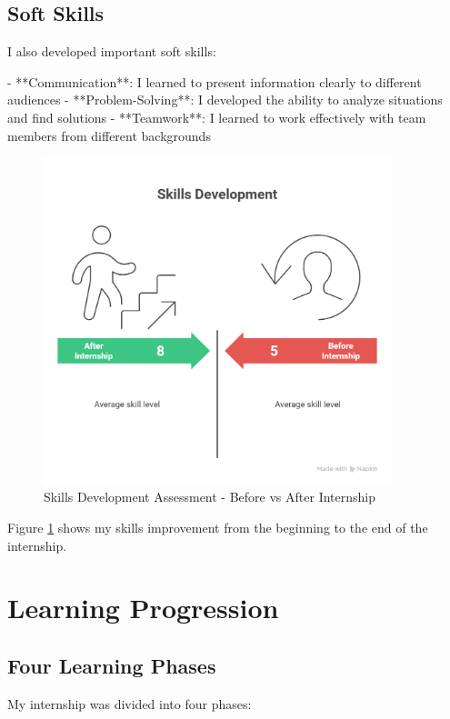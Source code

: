 \subsection{Soft Skills}
I also developed important soft skills:

- **Communication**: I learned to present information clearly to different audiences
- **Problem-Solving**: I developed the ability to analyze situations and find solutions
- **Teamwork**: I learned to work effectively with team members from different backgrounds

\begin{figure}[H]
    \centering
    \includegraphics[width=0.9\textwidth]{assets/images/skills_radar_chart.png}
    \caption{Skills Development Assessment - Before vs After Internship}
    \label{fig:skills_radar_chart}
\end{figure}

Figure \ref{fig:skills_radar_chart} shows my skills improvement from the beginning to the end of the internship.

\section{Learning Progression}

\subsection{Four Learning Phases}
My internship was divided into four phases:

